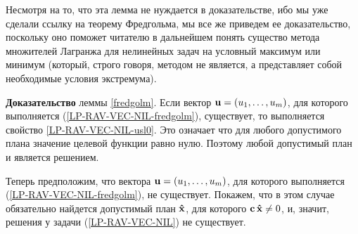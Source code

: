 Несмотря на то, что эта лемма не нуждается в доказательстве, ибо мы
уже сделали ссылку на теорему Фредгольма, мы все же приведем ее
доказательство, поскольку оно поможет читателю в дальнейшем понять
существо метода множителей Лагранжа для нелинейных задач на условный
максимум или минимум (который, строго говоря, методом не является, а
представляет собой необходимые условия экстремума).

\textbf{Доказательство} леммы \ref{fredgolm}. Если вектор
$\mathbf{u}=(u_{1},\ldots,u_{m})$, для которого выполняется
(\ref{LP-RAV-VEC-NIL-fredgolm}), существует, то выполняется свойство
\ref{LP-RAV-VEC-NIL-usl0}. Это означает что для любого допустимого
плана значение целевой функции равно нулю. Поэтому любой допустимый
план и является решением.

Теперь предположим, что вектора $\mathbf{u}=(u_{1},\ldots,u_{m})$, для
которого выполняется (\ref{LP-RAV-VEC-NIL-fredgolm}), не существует.
Покажем, что в этом случае обязательно найдется допустимый план
 $\mathbf{\hat{x}}$, для которого $\mathbf{c} \,\mathbf{\hat{x}}\neq0$, и,
 значит, решения у задачи (\ref{LP-RAV-VEC-NIL}) не существует.

